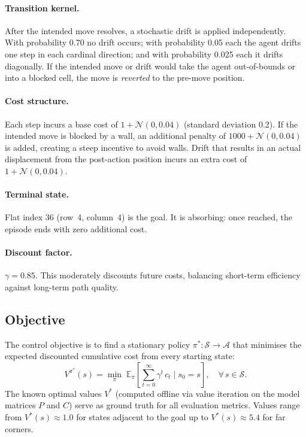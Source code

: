 \documentclass[11pt]{article}
\begin{document}
\paragraph{Transition kernel.}
After the intended move resolves, a stochastic drift is applied independently.
With probability 0.70 no drift occurs; with probability 0.05 each the agent
drifts one step in each cardinal direction; and with probability 0.025 each
it drifts diagonally.  If the intended move or drift would take the agent
out-of-bounds or into a blocked cell, the move is \emph{reverted} to the
pre-move position.

\paragraph{Cost structure.}
Each step incurs a base cost of $1 + \mathcal{N}(0, 0.04)$ (standard
deviation 0.2).  If the intended move is blocked by a wall, an additional
penalty of $1000 + \mathcal{N}(0, 0.04)$ is added, creating a steep incentive
to avoid walls.  Drift that results in an actual displacement from the
post-action position incurs an extra cost of $1 + \mathcal{N}(0, 0.04)$.

\paragraph{Terminal state.}
Flat index 36 (row~4, column~4) is the goal.  It is absorbing: once reached,
the episode ends with zero additional cost.

\paragraph{Discount factor.}
$\gamma = 0.85$.  This moderately discounts future costs, balancing short-term
efficiency against long-term path quality.

\subsection{Objective}

The control objective is to find a stationary policy
$\pi^*: \mathcal{S} \to \mathcal{A}$ that minimises the expected discounted
cumulative cost from every starting state:
\begin{equation}
    V^{\pi^*}(s) = \min_{\pi}\; \mathbb{E}_{\pi}\!\left[
        \sum_{t=0}^{\infty} \gamma^t\, c_t \;\Big|\; s_0 = s
    \right], \quad \forall\, s \in \mathcal{S}.
\end{equation}
The known optimal values $V^*$ (computed offline via value iteration on the
model matrices $P$ and $C$) serve as ground truth for all evaluation metrics.
Values range from $V^*(s)\approx 1.0$ for states adjacent to the goal up to
$V^*(s)\approx 5.4$ for far corners.
\end{document}
